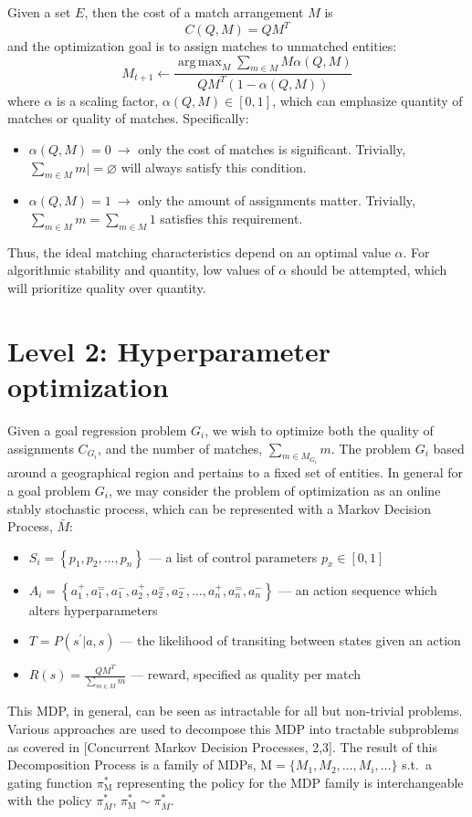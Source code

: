 \documentclass[compsoc,journal,letterpaper,10pt,draftclsnofoot,onecolumn]{IEEEtran}
\DeclareMathOperator*{\argmax}{arg\,max}
\begin{document}
Given a set $E$, then the cost of a match arrangement $M$ is
\begin{equation}
  C(Q,M) = QM^{T}
\end{equation}
and the optimization goal is to assign matches to unmatched entities:
\begin{equation}
  M_{t+1} \leftarrow \frac{\argmax_{M}\sum_{m\in M} M\alpha(Q,M)}{QM^{T}\left(1-\alpha(Q,M)\right)}
\end{equation}
where $\alpha$ is a scaling factor, $\alpha(Q,M)\in [0,1]$, which can emphasize quantity of matches or quality of matches.
Specifically:
\begin{itemize}[label={}]
\item $\alpha(Q,M)=0\:\rightarrow$ only the cost of matches is significant. Trivially, $\displaystyle \sum_{m\in M}m | = \varnothing$ will always satisfy this condition.
\item $\alpha(Q,M)=1\:\rightarrow$ only the amount of assignments matter. Trivially, $\displaystyle \sum_{m\in M} m = \sum_{m\in M}1$ satisfies this requirement.
\end{itemize}
Thus, the ideal matching characteristics depend on an optimal value $\alpha$. For algorithmic stability and quantity, low values of $\alpha$ should be attempted, which will prioritize quality over quantity.

\section*{Level 2: Hyperparameter optimization}

Given a goal regression problem $G_i$, we wish to optimize both the quality of assignments $C_{G_i}$, and the number of matches, $\displaystyle \sum_{m \in M_{G_i}}m$. The problem $G_i$ based around a geographical region and pertains to a fixed set of entities. In general for a goal problem $G_i$, we may consider the problem of optimization as an online stably stochastic process, which can be represented with a Markov Decision Process, $\bar{M}$:
\begin{itemize}[label={}]
\item $S_i=\left\{p_1,p_2,\ldots,p_n\right\}$ --- a list of control parameters $p_x\in [0,1]$
\item $A_i = \left\{ a_1^{+}, a_1^{=}, a_1^{-}, a_2^{+}, a_2^{=}, a_2^{-}, \ldots, a_n^{+}, a_n^{=}, a_n^{-} \right\}$ --- an action sequence which alters hyperparameters
\item $T=P(s^\prime|a,s)$ --- the likelihood of transiting between states given an action
  \item $R(s) = \frac{QM^T}{\sum_{m\in M}m}$ --- reward, specified as quality per match
\end{itemize}
This MDP, in general, can be seen as intractable for all but non-trivial problems. Various approaches are used to decompose this MDP into
tractable subproblems as covered in [Concurrent Markov Decision Processes, 2,3]. The result of this Decomposition Process is a family of MDPs,
$\mathrm{M}=\{M_1,M_2,\ldots,M_i,\ldots\}$ s.t.\ a gating function $\pi^{\ast}_{\mathrm{M}}$ representing the policy for the MDP family is interchangeable with the policy $\pi^{\ast}_{\bar{M}}$, $\pi^{\ast}_{\mathrm{M}} \sim \pi^{\ast}_{\bar{M}}$.
\end{document}
